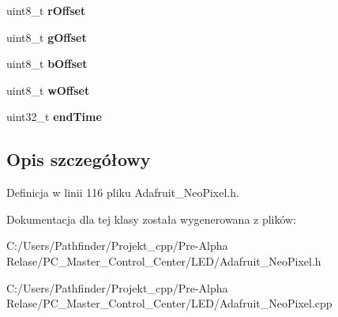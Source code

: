 \begin{DoxyCompactItemize}
uint8\+\_\+t {\bfseries r\+Offset}
\item 
\mbox{\label{class_adafruit___neo_pixel_a3db2bc3b72073fd9a86438128186fc98}} 
uint8\+\_\+t {\bfseries g\+Offset}
\item 
\mbox{\label{class_adafruit___neo_pixel_aeb2fc94bc0568778b3a643977a8b6a95}} 
uint8\+\_\+t {\bfseries b\+Offset}
\item 
\mbox{\label{class_adafruit___neo_pixel_abb82afb6bb4c4e365561f18c6ff6b6a8}} 
uint8\+\_\+t {\bfseries w\+Offset}
\item 
\mbox{\label{class_adafruit___neo_pixel_a1774fd792c71e961624594e0c29e4541}} 
uint32\+\_\+t {\bfseries end\+Time}
\end{DoxyCompactItemize}


\subsection{Opis szczegółowy}


Definicja w linii 116 pliku Adafruit\+\_\+\+Neo\+Pixel.\+h.



Dokumentacja dla tej klasy została wygenerowana z plików\+:\begin{DoxyCompactItemize}
\item 
C\+:/\+Users/\+Pathfinder/\+Projekt\+\_\+cpp/\+Pre-\/\+Alpha Relase/\+P\+C\+\_\+\+Master\+\_\+\+Control\+\_\+\+Center/\+L\+E\+D/Adafruit\+\_\+\+Neo\+Pixel.\+h\item 
C\+:/\+Users/\+Pathfinder/\+Projekt\+\_\+cpp/\+Pre-\/\+Alpha Relase/\+P\+C\+\_\+\+Master\+\_\+\+Control\+\_\+\+Center/\+L\+E\+D/Adafruit\+\_\+\+Neo\+Pixel.\+cpp\end{DoxyCompactItemize}
